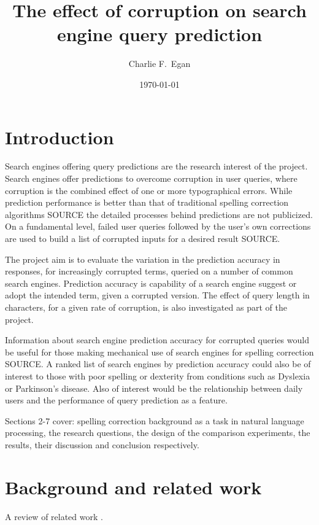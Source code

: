 \documentclass{csfourzero}
\title{The effect of corruption on search engine query prediction}
\author{Charlie F.\ Egan}
\date{\today}
\begin{document}
\maketitle

\section{Introduction}
\label{sec:intro}

Search engines offering query predictions are the research interest of the project. Search engines offer predictions to overcome corruption in user queries, where corruption is the combined effect of one or more typographical errors. While prediction performance is better than that of traditional spelling correction algorithms SOURCE the detailed processes behind predictions are not publicized. On a fundamental level, failed user queries followed by the user's own corrections are used to build a list of corrupted inputs for a desired result SOURCE.

The project aim is to evaluate the variation in the prediction accuracy in responses, for increasingly corrupted terms, queried on a number of common search engines. Prediction accuracy is capability of a search engine suggest or adopt the intended term, given a corrupted version. The effect of query length in characters, for a given rate of corruption, is also investigated as part of the project.

Information about search engine prediction accuracy for corrupted queries would be useful for those making mechanical use of search engines for spelling correction SOURCE. A ranked list of search engines by prediction accuracy could also be of interest to those with poor spelling or dexterity from conditions such as Dyslexia or Parkinson's disease. Also of interest would be the relationship between daily users and the performance of query prediction as a feature.

Sections 2-7 cover: spelling correction background as a task in natural language processing, the research questions, the design of the comparison experiments, the results, their discussion and conclusion respectively.

\section{Background and related work}
\label{sec:lit}

A review of related work \cite{p2pbookv2,Burnett,p2pwiki}.
\end{document}
